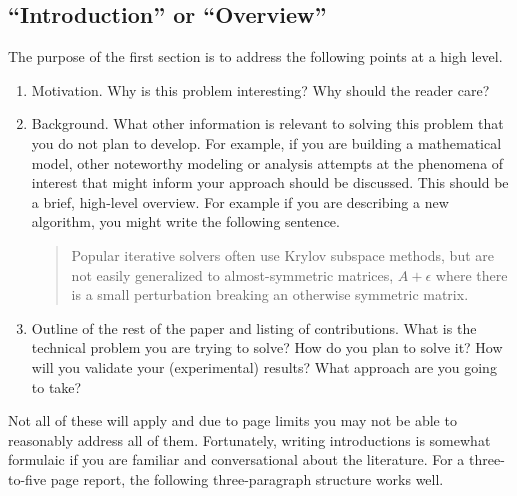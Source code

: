 \documentclass[]{article}
\begin{document}
\subsection{``Introduction'' or ``Overview''}
The purpose of the first section is to address the following points at a high level.
\begin{enumerate}
    \item Motivation. Why is this problem interesting? Why should the reader care?
    \item Background. What other information is relevant to solving this problem that you do not plan to develop. For example, if you are building a mathematical model, other noteworthy modeling or analysis attempts at the phenomena of interest that might inform your approach should be discussed. This should be a brief, high-level overview. For example if you are describing a new algorithm, you might write the following sentence.
    \begin{quote}
        Popular iterative solvers often use Krylov subspace methods, but are not easily generalized to almost-symmetric matrices, $A+\epsilon$ where there is a small perturbation breaking an otherwise symmetric matrix.
    \end{quote}

    \item Outline of the rest of the paper and listing of contributions. What is the technical problem you are trying to solve? How do you plan to solve it? How will you validate your (experimental) results?
          What approach are you going to take?
\end{enumerate}

Not all of these will apply and due to page limits you may not be able to reasonably address all of them. Fortunately, writing introductions is somewhat formulaic if you are familiar and conversational about the literature. For a three-to-five page report, the following three-paragraph structure works well.
\end{document}

